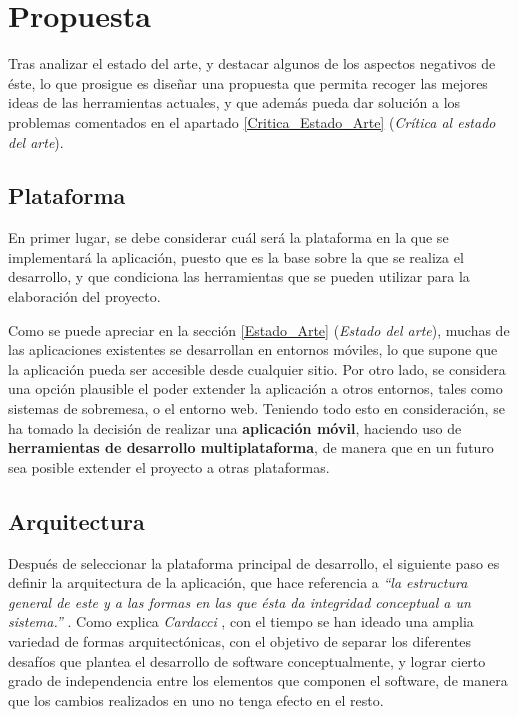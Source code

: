 

\section{Propuesta} \label{Propuesta}
Tras analizar el estado del arte, y destacar algunos de los aspectos negativos de éste, lo que prosigue es diseñar una 
propuesta que permita recoger las mejores ideas de las herramientas actuales, y que además pueda dar solución a los 
problemas comentados en el apartado \ref{Critica_Estado_Arte} (\textit{Crítica al estado del arte}). \medskip

\subsection{Plataforma} \label{Plataforma}
En primer lugar, se debe considerar cuál será la plataforma en la que se implementará la aplicación, puesto que es la base 
sobre la que se realiza el desarrollo, y que condiciona las herramientas que se pueden utilizar para la elaboración del proyecto. 
\medskip

Como se puede apreciar en la sección \ref{Estado_Arte} (\textit{Estado del arte}), muchas de las aplicaciones existentes 
se desarrollan en entornos móviles, lo que supone que la aplicación pueda ser accesible desde cualquier sitio. Por otro lado, 
se considera una opción plausible el poder extender la aplicación a otros entornos, tales como sistemas de sobremesa, o el entorno 
web. Teniendo todo esto en consideración, se ha tomado la decisión de realizar una \textbf{aplicación móvil}, haciendo uso de 
\textbf{herramientas de desarrollo multiplataforma}, de manera que en un futuro sea posible extender el proyecto a otras plataformas.

\newpage

\subsection{Arquitectura} \label{Arquitectura}
Después de seleccionar la plataforma principal de desarrollo, el siguiente paso es definir la arquitectura de la aplicación, 
que hace referencia a \textit{“la estructura general de este y a las formas en las que ésta da integridad conceptual a un 
sistema.”} \autocite*{Shaw1995}. Como explica \textit{Cardacci} \autocite*{Addati2013}, con el tiempo se han ideado una amplia 
variedad de formas arquitectónicas, con el objetivo de separar los diferentes desafíos que plantea el desarrollo de software 
conceptualmente, y lograr cierto grado de independencia entre los elementos que componen el software, de manera que los cambios 
realizados en uno no tenga efecto en el resto. \medskip

